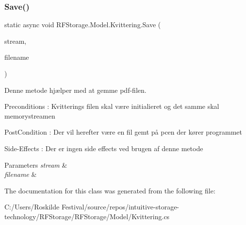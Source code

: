\subsubsection{Save()}
{\footnotesize\ttfamily static async void R\+F\+Storage.\+Model.\+Kvittering.\+Save (\begin{DoxyParamCaption}\item[{Stream}]{stream,  }\item[{string}]{filename }\end{DoxyParamCaption})\hspace{0.3cm}{\ttfamily [static]}}



Denne metode hjælper med at gemme pdf-\/filen. 

Preconditions \+: Kvitterings filen skal være initialieret og det samme skal memorystreamen

Post\+Condition \+: Der vil herefter være en fil gemt på pcen der kører programmet

Side-\/\+Effects \+: Der er ingen side effects ved brugen af denne metode


\begin{DoxyParams}{Parameters}
{\em stream} & \\
\hline
{\em filename} & \\
\hline
\end{DoxyParams}


The documentation for this class was generated from the following file\+:\begin{DoxyCompactItemize}
\item 
C\+:/\+Users/\+Roskilde Festival/source/repos/intuitive-\/storage-\/technology/\+R\+F\+Storage/\+R\+F\+Storage/\+Model/Kvittering.\+cs\end{DoxyCompactItemize}
